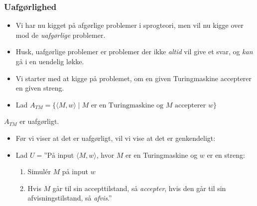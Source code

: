 \begin{frame}[allowframebreaks]
	\frametitle{Uafgørlighed}

	\begin{itemize}
		\item Vi har nu kigget på afgørlige problemer i sprogteori, men vil nu kigge over mod de \textit{uafgørlige} problemer.
		\item Husk, uafgørlige problemer er problemer der ikke \textit{altid} vil give et svar, og \textit{kan} gå i en uendelig løkke.
		\item Vi starter med at kigge på problemet, om en given Turingmaskine accepterer en given streng.
		\item Lad $A_{TM} = \{\langle M, w \rangle \mid M \text{ er en Turingmaskine og } M \text{ accepterer }w\}$
	\end{itemize}

	\begin{theorem}
		$A_{TM}$ er uafgørligt.
	\end{theorem}

	\begin{itemize}
		\item Før vi viser at det er uafgørligt, vil vi vise at det er genkendeligt:

		\item Lad $U = $''På input \(\langle M , w \rangle\), hvor $M$ er en Turingmaskine og $w$ er en streng:
		      \begin{enumerate}
			      \item Simulér $M$ på input $w$
			      \item Hvis $M$ går til sin accepttilstand, så \textit{accepter}, hvis den går til sin afvisningstilstand, så \textit{afvis}.''
		      \end{enumerate}


\end{itemize}
\end{frame}
